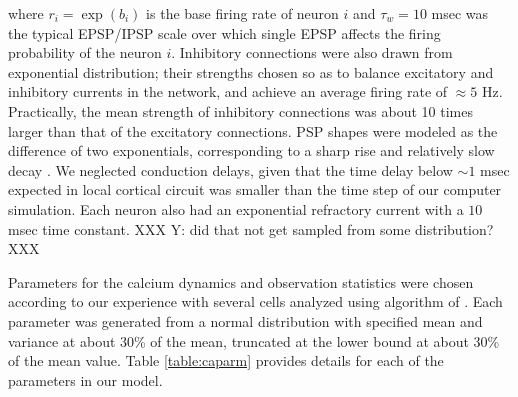 \noindent where $r_i=\exp(b_i)$ is the base firing rate of neuron $i$ and $\tau_w=10$ msec was the typical EPSP/IPSP scale over which single EPSP affects the firing probability of the neuron $i$. Inhibitory connections were also drawn from exponential distribution; their strengths chosen so as to balance excitatory and inhibitory currents in the network, and achieve an average firing rate of  $\approx 5 $ Hz. Practically, the mean strength of inhibitory connections was about 10 times larger than that of the excitatory connections. PSP shapes were modeled as the difference of two exponentials, corresponding to a sharp rise and relatively slow decay \cite{Sayer1990}. 
We neglected conduction delays, given that the time delay below $\sim 1$ msec expected in local cortical circuit was smaller than the time step of our computer simulation.  Each neuron also had an exponential refractory current with a $10$ msec time constant. XXX Y: did that not get sampled from some distribution? XXX

Parameters for the calcium dynamics and observation statistics were chosen according to our experience with several cells analyzed using algorithm of \cite{Vogelstein2009}. Each parameter was generated from a normal distribution with specified mean and variance at about 30\% of the mean, truncated at the lower bound at about 30\% of the mean value.  Table \ref{table:caparm} provides details for each of the parameters in our model.

